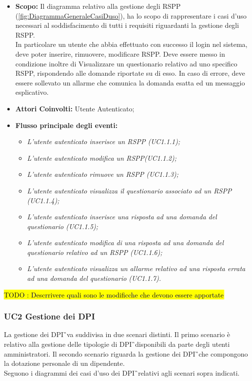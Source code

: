 		\begin{itemize}
			\item \textbf{Scopo:} Il diagramma relativo alla gestione degli RSPP (\autoref{fig:DiagrammaGeneraleCasiDuso}), ha lo scopo di rappresentare i casi d'uso necessari al soddisfacimento di tutti i requisiti riguardanti la gestione degli RSPP. \\
			In particolare un utente che abbia effettuato con successo il login nel sistema, deve poter inserire, rimuovere, modificare  RSPP. Deve essere messo in condizione inoltre di Visualizzare un questionario relativo ad uno specifico RSPP, rispondendo alle domande riportate su di esso. In caso di errore, deve essere sollevato un allarme che comunica la domanda esatta ed un messaggio esplicativo.
			\item \textbf{Attori Coinvolti:} Utente Autenticato;
			\item \textbf{Flusso principale degli eventi:} 
			\begin{itemize}
				\item \textit{L'utente autenticato inserisce un RSPP (UC1.1.1);}
				\item \textit{L'utente autenticato modifica un RSPP(UC1.1.2);}
				\item \textit{L'utente autenticato rimuove un RSPP (UC1.1.3);}
				\item \textit{L'utente autenticato visualizza il questionario associato ad un RSPP (UC1.1.4);}
				\item \textit{L'utente autenticato inserisce una risposta ad una domanda del questionario (UC1.1.5);}
				\item \textit{L'utente autenticato modifica di una risposta ad una domanda del questionario relativo ad un RSPP (UC1.1.6);}
				\item \textit{ L'utente autenticato visualizza un allarme relativo ad una risposta errata ad una domanda del questionario (UC1.1.7).}
			\end{itemize}
		\end{itemize}
			\hl{TODO : Descrrivere quali sono le modificche che devono essere apportate}
	\newpage	
	\subsubsection{UC2 Gestione dei DPI}
		\label{section:UC2}
		La gestione dei  \gls{DPI}\G\ va suddivisa in due scenari distinti. Il primo scenario è relativo alla gestione delle tipologie di \gls{DPI}\G\ disponibili da parte degli utenti amministratori. Il secondo scenario riguarda la gestione dei \gls{DPI}\G\ che compongono la dotazione personale di un dipendente. \\
		Seguono i diagrammi dei casi d'uso dei \gls{DPI}\G\ relativi agli scenari sopra indicati.

